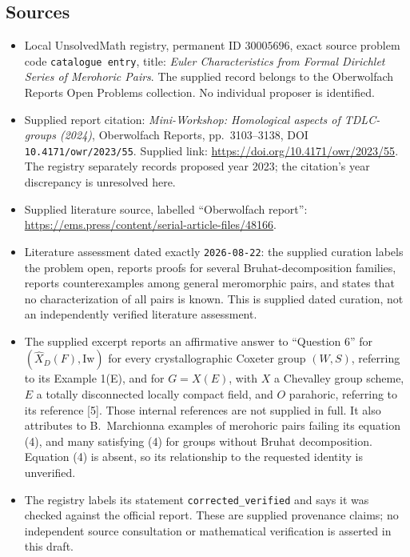\documentclass[11pt]{article}
\begin{document}
\subsection{Sources}
\begin{itemize}
\item Local UnsolvedMath registry, permanent ID \(30005696\), exact source problem code \texttt{catalogue entry}, title: \emph{Euler Characteristics from Formal Dirichlet Series of Merohoric Pairs}. The supplied record belongs to the Oberwolfach Reports Open Problems collection. No individual proposer is identified.
\item Supplied report citation: \emph{Mini-Workshop: Homological aspects of TDLC-groups (2024)}, Oberwolfach Reports, pp.\ 3103--3138, DOI \texttt{10.4171/owr/2023/55}. Supplied link: \url{https://doi.org/10.4171/owr/2023/55}. The registry separately records proposed year 2023; the citation's year discrepancy is unresolved here.
\item Supplied literature source, labelled ``Oberwolfach report'': \url{https://ems.press/content/serial-article-files/48166}.
\item Literature assessment dated exactly \texttt{2026-08-22}: the supplied curation labels the problem open, reports proofs for several Bruhat-decomposition families, reports counterexamples among general meromorphic pairs, and states that no characterization of all pairs is known. This is supplied dated curation, not an independently verified literature assessment.
\item The supplied excerpt reports an affirmative answer to ``Question 6'' for \((\widehat X_D(F),\mathrm{Iw})\) for every crystallographic Coxeter group \((W,S)\), referring to its Example 1(E), and for \(G=X(E)\), with \(X\) a Chevalley group scheme, \(E\) a totally disconnected locally compact field, and \(O\) parahoric, referring to its reference [5]. Those internal references are not supplied in full. It also attributes to B.\ Marchionna examples of merohoric pairs failing its equation (4), and many satisfying (4) for groups without Bruhat decomposition. Equation (4) is absent, so its relationship to the requested identity is unverified.
\item The registry labels its statement \texttt{corrected\_verified} and says it was checked against the official report. These are supplied provenance claims; no independent source consultation or mathematical verification is asserted in this draft.
\end{itemize}
\end{document}
